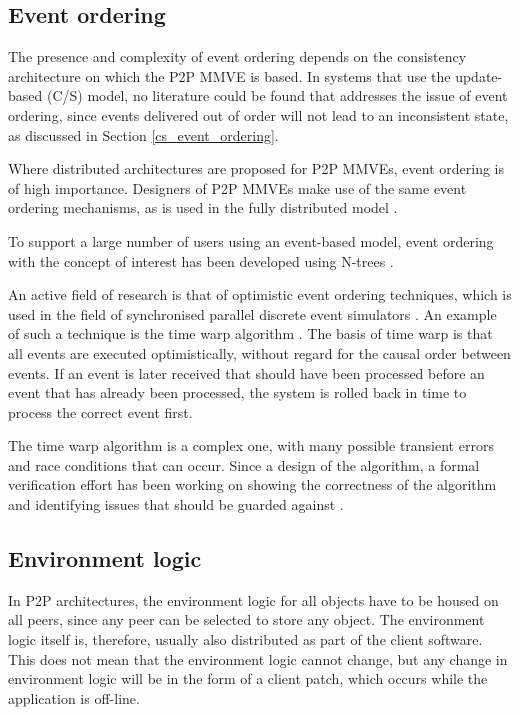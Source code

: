 \subsection{Event ordering}

The presence and complexity of event ordering depends on the consistency architecture on which the P2P MMVE is based. In systems that use the update-based (C/S) model, no literature could be found that addresses the issue of event ordering, since events delivered out of order will not lead to an inconsistent state, as discussed in Section \ref{cs_event_ordering}.

Where distributed architectures are proposed for P2P MMVEs, event ordering is of high importance. Designers of P2P MMVEs make use of the same event ordering mechanisms, as is used in the fully distributed model \cite{hybrid_storage1}.

To support a large number of users using an event-based model, event ordering with the concept of interest has been developed using N-trees \cite{GauthierDickey_ntrees}.

An active field of research is that of optimistic event ordering techniques, which is used in the field of synchronised parallel discrete event simulators \cite{Fujimoto_parallel_discrete_event_simulation}. An example of such a technique is the time warp algorithm \cite{Jefferson_time_warp}. The basis of time warp is that all events are executed optimistically, without regard for the causal order between events. If an event is later received that should have been processed before an event that has already been processed, the system is rolled back in time to process the correct event first.

The time warp algorithm is a complex one, with many possible transient errors and race conditions that can occur. Since a design of the algorithm, a formal verification effort has been working on showing the correctness of the algorithm and identifying issues that should be guarded against \cite{time_warp_formal_specification}.

\subsection{Environment logic}

In P2P architectures, the environment logic for all objects have to be housed on all peers, since any peer can be selected to store any object. The environment logic itself is, therefore, usually also distributed as part of the client software. This does not mean that the environment logic cannot change, but any change in environment logic will be in the form of a client patch, which occurs while the application is off-line.

